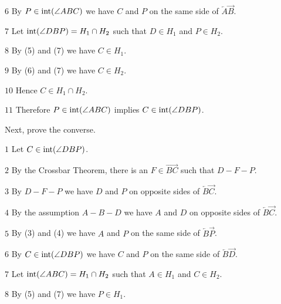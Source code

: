 \medskip
\item{$\scriptstyle6$}
By $P\in \mathop{\rm int}\nolimits(\angle ABC)$ we have $C$ and $P$ on the same side of
$\overleftarrow A\overrightarrow B$.

\medskip
\item{$\scriptstyle7$}
Let $\mathop{\rm int}\nolimits(\angle DBP)=H_1\cap H_2$ such that $D\in H_1$ and $P\in H_2$.

\medskip
\item{$\scriptstyle8$}
By (5) and (7) we have $C\in H_1$.

\medskip
\item{$\scriptstyle9$}
By (6) and (7) we have $C\in H_2$.

\medskip
\item{$\scriptstyle10$}
Hence $C\in H_1\cap H_2$.

\medskip
\item{$\scriptstyle11$}
Therefore $P\in \mathop{\rm int}\nolimits(\angle ABC)$ implies $C\in \mathop{\rm int}\nolimits(\angle DBP)$.

\medskip
\noindent
Next, prove the converse.

\medskip
\item{$\scriptstyle1$} Let $C\in \mathop{\rm int}\nolimits(\angle DBP)$.

\medskip
\item{$\scriptstyle2$}
By the Crossbar Theorem, there is an $F\in\overrightarrow{BC}$ such that $D{-}F{-}P$.

\medskip
\item{$\scriptstyle3$}
By $D{-}F{-}P$ we have $D$ and $P$ on opposite sides of $\overleftarrow B\overrightarrow C$.

\medskip
\item{$\scriptstyle4$}
By the assumption $A{-}B{-}D$ we have
$A$ and $D$ on opposite sides of $\overleftarrow B\overrightarrow C$.

\medskip
\item{$\scriptstyle5$}
By (3) and (4) we have $A$ and $P$ on the same side of $\overleftarrow B\overrightarrow P$.

\medskip
\item{$\scriptstyle6$}
By $C\in \mathop{\rm int}\nolimits(\angle DBP)$ we have $C$ and $P$ on the same side of
$\overleftarrow B\overrightarrow D$.

\medskip
\item{$\scriptstyle7$}
Let $\mathop{\rm int}\nolimits(\angle ABC)=H_1\cap H_2$ such that $A\in H_1$ and $C\in H_2$.

\medskip
\item{$\scriptstyle8$}
By (5) and (7) we have $P\in H_1$.

